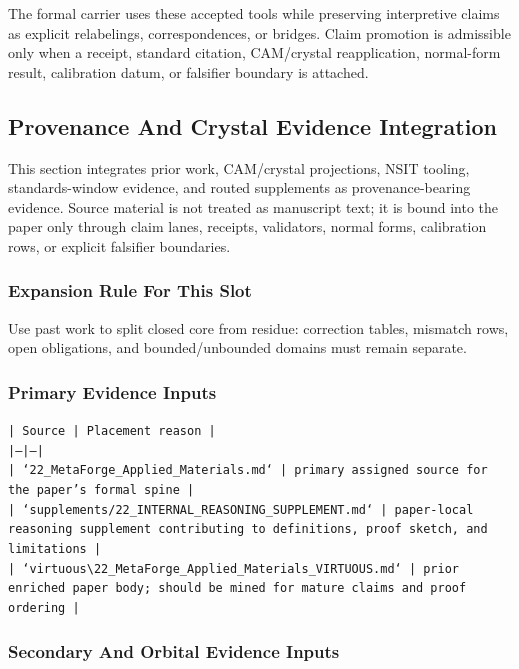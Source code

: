 \documentclass[11pt]{article}
\begin{document}
The formal carrier uses these accepted tools while preserving interpretive
claims as explicit relabelings, correspondences, or bridges. Claim promotion is admissible only when a receipt, standard citation,
CAM/crystal reapplication, normal-form result, calibration datum, or falsifier
boundary is attached.

\subsection*{Provenance And Crystal Evidence Integration}

This section integrates prior work, CAM/crystal projections, NSIT tooling,
standards-window evidence, and routed supplements as provenance-bearing
evidence. Source material is not treated as manuscript text; it is bound into
the paper only through claim lanes, receipts, validators, normal forms,
calibration rows, or explicit falsifier boundaries.

\subsubsection*{Expansion Rule For This Slot}

Use past work to split closed core from residue: correction tables, mismatch rows, open obligations, and bounded/unbounded domains must remain separate.

\subsubsection*{Primary Evidence Inputs}

\noindent\texttt{| Source | Placement reason |}\\
\noindent\texttt{|---|---|}\\
\noindent\texttt{| `22\_MetaForge\_Applied\_Materials.md` | primary assigned source for the paper's formal spine |}\\
\noindent\texttt{| `supplements/22\_INTERNAL\_REASONING\_SUPPLEMENT.md` | paper-local reasoning supplement contributing to definitions, proof sketch, and limitations |}\\
\noindent\texttt{| `virtuous\textbackslash{}22\_MetaForge\_Applied\_Materials\_VIRTUOUS.md` | prior enriched paper body; should be mined for mature claims and proof ordering |}\\

\subsubsection*{Secondary And Orbital Evidence Inputs}
\end{document}
